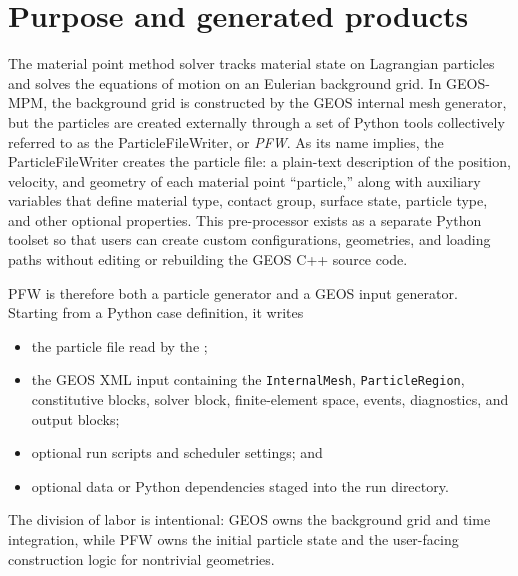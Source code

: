 \section{Purpose and generated products}
\label{sec:pfw-purpose}

The material point method solver tracks material state on Lagrangian particles and solves the equations of motion on an Eulerian background grid.  In GEOS-MPM, the background grid is constructed by the GEOS internal mesh generator, but the particles are created externally through a set of Python tools collectively referred to as the ParticleFileWriter, or \emph{PFW}.  As its name implies, the ParticleFileWriter creates the particle file: a plain-text description of the position, velocity, and geometry of each material point ``particle,'' along with auxiliary variables that define material type, contact group, surface state, particle type, and other optional properties.  This pre-processor exists as a separate Python toolset so that users can create custom configurations, geometries, and loading paths without editing or rebuilding the GEOS C++ source code.

PFW is therefore both a particle generator and a GEOS input generator.  Starting from a Python case definition, it writes
\begin{itemize}[leftmargin=*]
\item the particle file read by the ;
\item the GEOS XML input containing the \texttt{InternalMesh}, \texttt{ParticleRegion}, constitutive blocks, solver block, finite-element space, events, diagnostics, and output blocks;
\item optional run scripts and scheduler settings; and
\item optional data or Python dependencies staged into the run directory.
\end{itemize}
The division of labor is intentional: GEOS owns the background grid and time integration, while PFW owns the initial particle state and the user-facing construction logic for nontrivial geometries.
